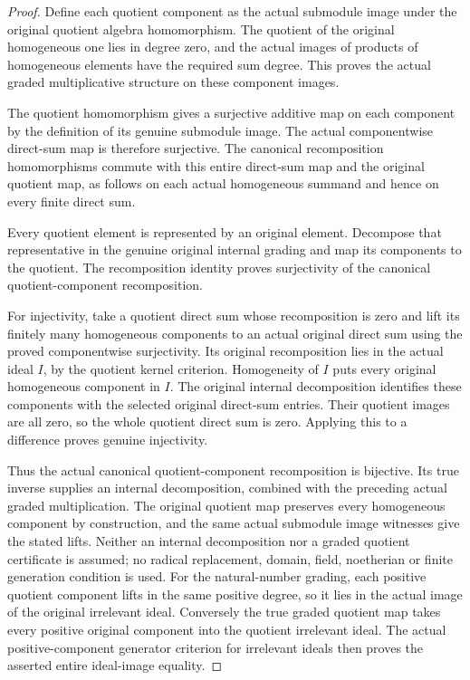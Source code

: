 \begin{proof}
Define each quotient component as the actual submodule image under the
original quotient algebra homomorphism. The quotient of the original
homogeneous one lies in degree zero, and the actual images of products
of homogeneous elements have the required sum degree. This proves the
actual graded multiplicative structure on these component images.

The quotient homomorphism gives a surjective additive map on each
component by the definition of its genuine submodule image. The actual
componentwise direct-sum map is therefore surjective. The canonical
recomposition homomorphisms commute with this entire direct-sum map
and the original quotient map, as follows on each actual homogeneous
summand and hence on every finite direct sum.

Every quotient element is represented by an original element. Decompose
that representative in the genuine original internal grading and map
its components to the quotient. The recomposition identity proves
surjectivity of the canonical quotient-component recomposition.

For injectivity, take a quotient direct sum whose recomposition is
zero and lift its finitely many homogeneous components to an actual
original direct sum using the proved componentwise surjectivity. Its
original recomposition lies in the actual ideal $I$, by the quotient
kernel criterion. Homogeneity of $I$ puts every original homogeneous
component in $I$. The original internal decomposition identifies these
components with the selected original direct-sum entries. Their quotient
images are all zero, so the whole quotient direct sum is zero. Applying
this to a difference proves genuine injectivity.

Thus the actual canonical quotient-component recomposition is
bijective. Its true inverse supplies an internal decomposition,
combined with the preceding actual graded multiplication. The original
quotient map preserves every homogeneous component by construction,
and the same actual submodule image witnesses give the stated lifts.
Neither an internal decomposition nor a graded quotient certificate is
assumed; no radical replacement, domain, field, noetherian or finite
generation condition is used. For the natural-number grading, each
positive quotient component lifts in the same positive degree, so it
lies in the actual image of the original irrelevant ideal. Conversely
the true graded quotient map takes every positive original component
into the quotient irrelevant ideal. The actual positive-component
generator criterion for irrelevant ideals then proves the asserted
entire ideal-image equality.
\end{proof}
